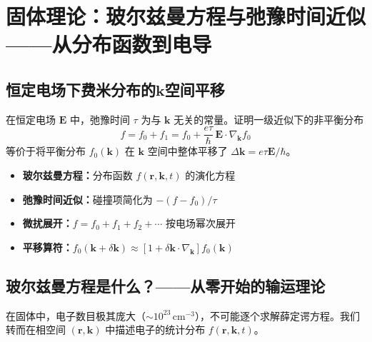 
\section{固体理论：玻尔兹曼方程与弛豫时间近似——从分布函数到电导}\label{sec:boltzmann}

\subsection*{恒定电场下费米分布的$\bm{k}$空间平移}

\begin{modelbox}[题目]
在恒定电场 $\bm{E}$ 中，弛豫时间 $\tau$ 为与 $\bm{k}$ 无关的常量。证明一级近似下的非平衡分布
\[
f = f_0 + f_1 = f_0 + \frac{e\tau}{\hbar}\,\bm{E} \cdot \nabla_{\!\bm{k}} f_0
\]
等价于将平衡分布 $f_0(\bm{k})$ 在 $\bm{k}$ 空间中整体平移了 $\Delta\bm{k} = e\tau\bm{E}/\hbar$。
\end{modelbox}

\begin{tipbox}[考点快速分析]
\begin{itemize}
    \item \textbf{玻尔兹曼方程：}分布函数 $f(\bm{r},\bm{k},t)$ 的演化方程
    \item \textbf{弛豫时间近似：}碰撞项简化为 $-(f - f_0)/\tau$
    \item \textbf{微扰展开：}$f = f_0 + f_1 + f_2 + \cdots$ 按电场幂次展开
    \item \textbf{平移算符：}$f_0(\bm{k} + \delta\bm{k}) \approx [1 + \delta\bm{k} \cdot \nabla_{\!\bm{k}}]f_0(\bm{k})$
\end{itemize}
\end{tipbox}

\subsection{玻尔兹曼方程是什么？——从零开始的输运理论}

在固体中，电子数目极其庞大（$\sim\!10^{23}\,\text{cm}^{-3}$），不可能逐个求解薛定谔方程。我们转而在相空间 $(\bm{r},\bm{k})$ 中描述电子的统计分布 $f(\bm{r},\bm{k},t)$。

